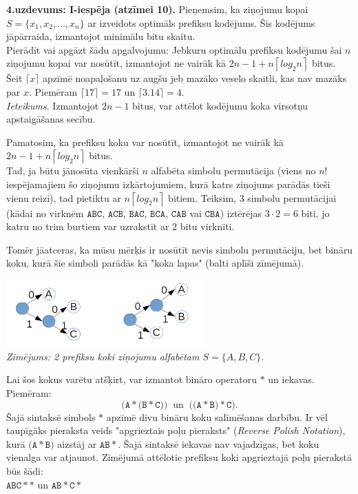 \documentclass[11pt]{article}
\begin{document}
{\footnotesize
\vspace{10ex}
\noindent
{\bf 4.uzdevums: I-iespēja (atzīmei 10).} 
Pieņemsim, ka ziņojumu kopai $S = \{ x_1, x_2, \ldots, x_n \}$ ar 
izveidots optimāls prefiksu kodējums. Šis kodējums jāpārraida,
izmantojot minimālu bitu skaitu.\\
Pierādīt vai apgāzt šādu 
apgalvojumu: Jebkuru optimālu prefiksu 
kodējumu šai $n$ ziņojumu kopai var nosūtīt, izmantojot ne vairāk kā 
${\displaystyle 2n - 1 + n \left\lceil log_2 n \right\rceil}$ bitus. 
Šeit $\lceil x \rceil$ apzīmē noapaļošanu uz augšu jeb 
mazāko veselo skaitli, kas nav mazāks par $x$.
Piemēram $\lceil 17 \rceil = 17$ un $\lceil 3.14 \rceil = 4$.\\
{\em Ieteikums.} Izmantojot $2n-1$ bitus, var attēlot kodējumu koka 
virsotņu apstaigāšanas secību.
}

Pamatosim, ka prefiksu koku var nosūtīt, izmantojot ne vairāk kā
${\displaystyle 2n - 1 + n \left\lceil log_2 n \right\rceil}$ bitus.\\

Tad, ja būtu jānosūta vienkārši $n$ alfabēta simbolu permutācija (viens no $n!$ 
iespējamajiem šo ziņojumu izkārtojumiem, kurā katrs ziņojums parādās tieši vienu reizi), 
tad pietiktu ar $n \left\lceil log_2 n \right\rceil$ bitiem. Teiksim, 
$3$ simbolu permutācijai (kādai no virknēm $\mathtt{ABC}$, 
$\mathtt{ACB}$, $\mathtt{BAC}$, $\mathtt{BCA}$, $\mathtt{CAB}$ vai $\mathtt{CBA}$)
iztērējas $3 \cdot 2 = 6$ biti, jo katru no trim burtiem var uzrakstīt 
ar $2$ bitu virknīti. 

Tomēr jāatceras, ka mūsu mērķis ir nosūtīt nevis simbolu permutāciju, bet 
bināru koku, kurā šie simboli parādās kā "koka lapas" (balti aplīši zīmējumā). 

\begin{center}
\includegraphics[width=3in]{prefix-trees.png}\\
{\em Zīmējums: 2 prefiksu koki ziņojumu alfabētam $S = \{ A,B,C\}$.}
\end{center}

Lai šos kokus varētu atšķirt, var izmantot bināro operatoru $\ast$ un iekavas. Piemēram: 
$$\mathtt{(A}\ast\mathtt{(B}\ast\mathtt{C))}\;\;\text{un}\;\;\mathtt{((A}\ast\mathtt{B)}\ast\mathtt{C)}.$$
Šajā sintaksē simbols $\ast$ apzīmē divu bināru koku salīmēšanas darbību. 
Ir vēl taupīgāks pieraksta veids \textendash{} "apgrieztais poļu pieraksts"
({\em Reverse Polish Notation}), kurā 
$\mathtt{(A}\ast\mathtt{B)}$ aizstāj ar $\mathtt{AB}\ast$. Šajā sintaksē iekavas nav vajadzīgas, 
bet koku vienalga var atjaunot. 
Zīmējumā attēlotie prefiksu koki apgrieztajā poļu pierakstā būs šādi:\\
$\mathtt{ABC}\ast\ast$ un $\mathtt{AB}\ast\mathtt{C}\ast$
\end{document}
